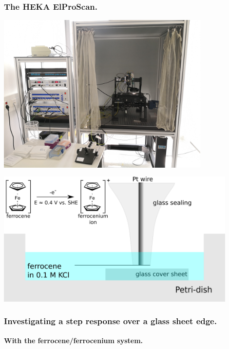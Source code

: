 \documentclass{beamer}
\begin{document}
\begin{frame}
 \frametitle{The HEKA ElProScan.}

        \centering
        \includegraphics[width=0.8\textwidth]{heka.jpg}
\end{frame}




\begin{frame}
        \centering
        \includegraphics[width=0.9\textwidth]{step.eps}
        \frametitle{Investigating a step response over a glass sheet edge.}
        \framesubtitle{With the ferrocene/ferrocenium system.}
\vfill
\end{frame}
\end{document}
